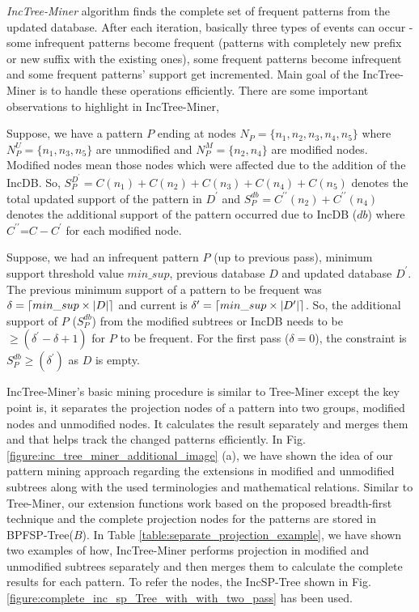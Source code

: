 \textit{IncTree-Miner} algorithm finds the complete set of frequent patterns from the updated database. After each iteration, basically three types of events can occur - some infrequent patterns become frequent (patterns with completely new prefix or new suffix with the existing ones), some frequent patterns become infrequent and some frequent patterns' support get incremented. Main goal of the IncTree-Miner is to handle these operations efficiently. There are some important observations to highlight in IncTree-Miner,
\begin{definition}
    Suppose, we have a pattern $P$ ending at nodes $N_{P}=\{n_{1},n_{2},n_{3},n_{4},n_{5}\}$ where $N_{P}^{U}=\{n_{1},n_{3},n_{5}\}$ are unmodified and $N_{P}^{M}=\{n_{2},n_{4}\}$ are modified nodes. Modified nodes mean those nodes which were affected due to the addition of the IncDB. So, $S_{P}^{D^{\prime}}=C(n_{1})+C(n_{2})+C(n_{3})+C(n_{4})+C(n_{5})$ denotes the total updated support of the pattern  in  $D^{\prime}$ and $S_{P}^{db}=C^{\prime\prime}(n_{2})+C^{\prime\prime}(n_{4})$ denotes the additional support of the pattern occurred due to IncDB ($db$) where $C^{\prime\prime}$=$C-C^{\prime}$ for each modified node.
\end{definition}
\begin{definition}
     Suppose, we had an infrequent pattern $P$ (up to previous pass), minimum support threshold value $min\_sup$, previous database $D$ and updated database $D^{\prime}$. The previous minimum support of a pattern to be frequent was $\delta=\lceil min\_sup \times \vert D \vert\rceil$ and current is $\delta^{\prime}=\lceil min\_sup \times \vert D^{\prime} \vert\rceil$. So, the additional support of $P$ ($S_{P}^{db}$) from the modified subtrees or IncDB needs to be $\geq(\delta^{\prime}-\delta+1)$ for $P$ to be frequent. For the first pass ($\delta=0$), the constraint is $S_{P}^{db}\geq(\delta^{\prime})$ as $D $ is empty.
\end{definition}
IncTree-Miner's basic mining procedure is similar to Tree-Miner except the key point is, it separates the projection nodes of a pattern into two groups, modified nodes and unmodified nodes. It calculates the result separately and merges them and that helps track the changed patterns efficiently. In Fig. \ref{figure:inc_tree_miner_additional_image} (a), we have shown the idea of our pattern mining approach regarding the extensions in modified and unmodified subtrees along with the used terminologies and mathematical relations. Similar to Tree-Miner, our extension functions work based on the proposed breadth-first technique and the complete projection nodes for the patterns are stored in BPFSP-Tree($B$). In Table \ref{table:separate_projection_example}, we have shown two examples of how, IncTree-Miner performs projection in modified and unmodified subtrees separately and then merges them to calculate the complete results for each pattern. To refer the nodes, the IncSP-Tree shown in Fig. \ref{figure:complete_inc_sp_Tree_with_with_two_pass} has been used.

